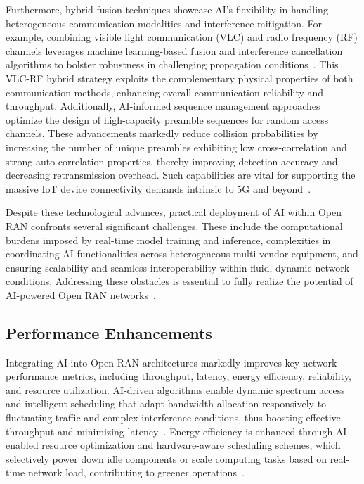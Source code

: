 \documentclass[sigconf]{acmart}
\begin{document}
Furthermore, hybrid fusion techniques showcase AI's flexibility in handling heterogeneous communication modalities and interference mitigation. For example, combining visible light communication (VLC) and radio frequency (RF) channels leverages machine learning-based fusion and interference cancellation algorithms to bolster robustness in challenging propagation conditions~\cite{ref25}. This VLC-RF hybrid strategy exploits the complementary physical properties of both communication methods, enhancing overall communication reliability and throughput. Additionally, AI-informed sequence management approaches optimize the design of high-capacity preamble sequences for random access channels. These advancements markedly reduce collision probabilities by increasing the number of unique preambles exhibiting low cross-correlation and strong auto-correlation properties, thereby improving detection accuracy and decreasing retransmission overhead. Such capabilities are vital for supporting the massive IoT device connectivity demands intrinsic to 5G and beyond~\cite{ref21}.

Despite these technological advances, practical deployment of AI within Open RAN confronts several significant challenges. These include the computational burdens imposed by real-time model training and inference, complexities in coordinating AI functionalities across heterogeneous multi-vendor equipment, and ensuring scalability and seamless interoperability within fluid, dynamic network conditions. Addressing these obstacles is essential to fully realize the potential of AI-powered Open RAN networks~\cite{ref49,ref54}.

\subsection{Performance Enhancements}

Integrating AI into Open RAN architectures markedly improves key network performance metrics, including throughput, latency, energy efficiency, reliability, and resource utilization. AI-driven algorithms enable dynamic spectrum access and intelligent scheduling that adapt bandwidth allocation responsively to fluctuating traffic and complex interference conditions, thus boosting effective throughput and minimizing latency~\cite{ref54}. Energy efficiency is enhanced through AI-enabled resource optimization and hardware-aware scheduling schemes, which selectively power down idle components or scale computing tasks based on real-time network load, contributing to greener operations~\cite{ref49}.
\end{document}
